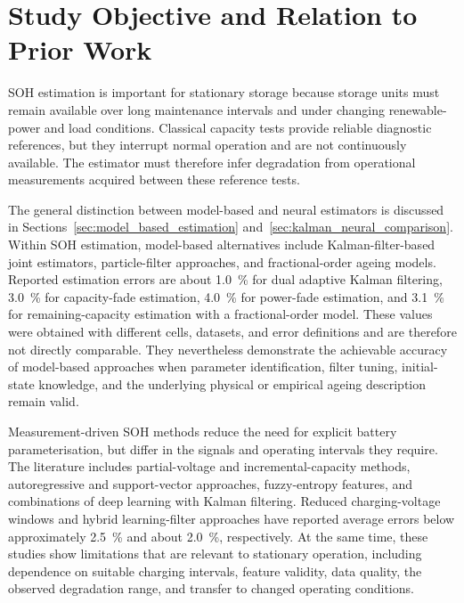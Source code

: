 \documentclass[
    a4paper,
    12pt,
    titlepage,
    bibliography=totoc,
    twoside=on,
    parskip=false,
    numbers=noenddot,
    cleardoublepage=empty,
    DIV=12,
    BCOR=12.0mm,
    headheight=36pt,
    headings=openright
]{scrreprt}
\begin{document}
\section{Study Objective and Relation to Prior Work}
\label{sec:ageing_objective}
SOH estimation is important for stationary storage because storage units must remain available over long maintenance intervals and under changing renewable-power and load conditions.\autocite{sahriEnergyManagementSystem2021,solimanSupervisoryEnergyManagement2021} Classical capacity tests provide reliable diagnostic references, but they interrupt normal operation and are not continuously available. The estimator must therefore infer degradation from operational measurements acquired between these reference tests.

The general distinction between model-based and neural estimators is discussed in Sections~\ref{sec:model_based_estimation} and~\ref{sec:kalman_neural_comparison}. Within SOH estimation, model-based alternatives include Kalman-filter-based joint estimators, particle-filter approaches, and fractional-order ageing models. Reported estimation errors are about \SI{1.0}{\percent} for dual adaptive Kalman filtering, \SI{3.0}{\percent} for capacity-fade estimation, \SI{4.0}{\percent} for power-fade estimation, and \SI{3.1}{\percent} for remaining-capacity estimation with a fractional-order model.\autocite{liJointEstimationState2021,biOnlineStateHealth2020,tianFractionalOrderModelBasedIncremental2019} These values were obtained with different cells, datasets, and error definitions and are therefore not directly comparable. They nevertheless demonstrate the achievable accuracy of model-based approaches when parameter identification, filter tuning, initial-state knowledge, and the underlying physical or empirical ageing description remain valid.

Measurement-driven SOH methods reduce the need for explicit battery parameterisation, but differ in the signals and operating intervals they require. The literature includes partial-voltage and incremental-capacity methods, autoregressive and support-vector approaches, fuzzy-entropy features, and combinations of deep learning with Kalman filtering. Reduced charging-voltage windows and hybrid learning-filter approaches have reported average errors below approximately \SI{2.5}{\percent} and about \SI{2.0}{\percent}, respectively.\autocite{stroeStateofHealthEstimationLithiumIon2018,stroeSOHEstimationLMO2018,shiOptimizationStateCharge2021,kimImprovedStateofhealthPrediction2022,xiongOnlineStateofHealthEstimation2021,suiRobustFuzzyEntropyBased2022,joBatteryStateofHealthEstimation2021} At the same time, these studies show limitations that are relevant to stationary operation, including dependence on suitable charging intervals, feature validity, data quality, the observed degradation range, and transfer to changed operating conditions.\autocite{gouStateofHealthEstimationRemainingUsefulLife2020,ojiDataDrivenMethodsBattery2021}
\end{document}
